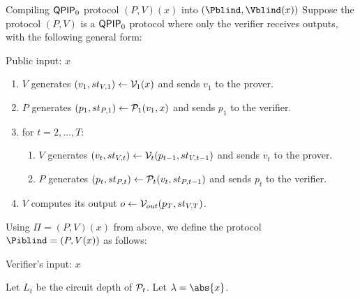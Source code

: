 \begin{protocol}{Compiling $\operatorname{\mathsf{QPIP}}_0$ protocol $(P, V)(x)$ into $(\Pblind, \Vblind(x))$}
	Suppose the protocol $(P, V)$ is a $\operatorname{\mathsf{QPIP}}_0$ protocol where only the verifier receives outputs, with the following general form:
	
	Public input: $x$
	\begin{enumerate}
		\item $V$ generates $(v_1, st_{V, 1})\leftarrow\mathcal{V}_1(x)$ and sends $v_1$ to the prover.
		\item $P$ generates $(p_1, st_{P, 1})\leftarrow\mathcal{P}_1(v_1, x)$ and sends $p_1$ to the verifier.
		\item for $t=2,\ldots,T$:
		\begin{enumerate}
			\item $V$ generates $(v_t, st_{V, t})\leftarrow\mathcal{V}_t(p_{t-1}, st_{V, t-1})$ and sends $v_t$ to the prover.
			\item $P$ generates $(p_t, st_{P, t})\leftarrow\mathcal{P}_t(v_t, st_{P, t-1})$ and sends $p_t$ to the verifier.
		\end{enumerate}
		\item $V$ computes its output $o\leftarrow\mathcal{V}_{out}(p_T, st_{V, T})$.
	\end{enumerate}

	Using $\Pi=(P, V)(x)$ from above, we define the protocol $\Piblind=(P, V(x))$ as follows:

	Verifier's input: $x$

	Let $L_t$ be the circuit depth of $\mathcal{P}_t$.
	Let $\lambda=\abs{x}$.


\end{protocol}
